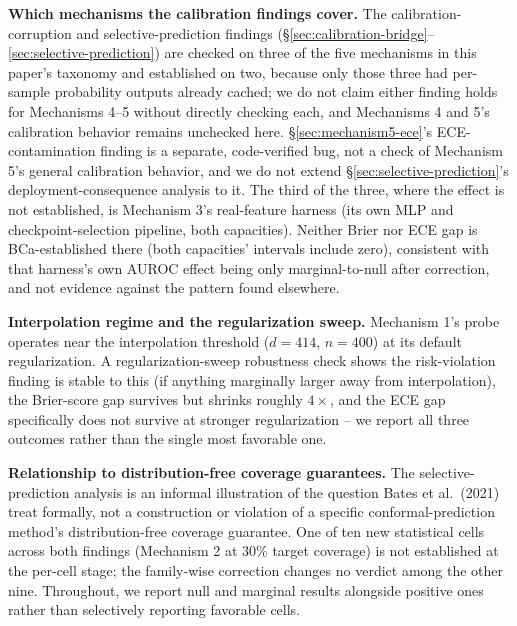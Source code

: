 \documentclass{article}
\begin{document}
\textbf{Which mechanisms the calibration findings cover.} The
calibration-corruption and selective-prediction findings
(\S\ref{sec:calibration-bridge}--\ref{sec:selective-prediction}) are checked on
three of the five mechanisms in this paper's taxonomy and established on two,
because only those three had per-sample probability outputs already cached;
we do not claim either finding holds for Mechanisms 4--5 without directly
checking each, and Mechanisms 4 and 5's calibration behavior remains unchecked
here. \S\ref{sec:mechanism5-ece}'s ECE-contamination finding is a separate,
code-verified bug, not a check of Mechanism 5's general calibration behavior,
and we do not extend \S\ref{sec:selective-prediction}'s deployment-consequence
analysis to it. The third of the three, where the effect is not
established, is Mechanism 3's real-feature harness (its own MLP and
checkpoint-selection pipeline, both capacities). Neither Brier nor ECE gap is BCa-established there (both
capacities' intervals include zero), consistent with that harness's own AUROC
effect being only marginal-to-null after correction, and not evidence against
the pattern found elsewhere.

\textbf{Interpolation regime and the regularization sweep.} Mechanism 1's probe
operates near the interpolation threshold ($d=414$, $n=400$) at its default
regularization. A regularization-sweep robustness check shows the
risk-violation finding is stable to this (if anything marginally larger away
from interpolation), the Brier-score gap survives but shrinks roughly
$4\times$, and the ECE gap specifically does not survive at stronger
regularization -- we report all three outcomes rather than the single most
favorable one.

\textbf{Relationship to distribution-free coverage guarantees.} The
selective-prediction analysis is an informal illustration of the question
Bates et al.\ (2021) treat formally, not a construction or violation of a
specific conformal-prediction method's distribution-free coverage guarantee.
One of ten new statistical cells across both findings (Mechanism 2 at $30\%$
target coverage) is not established at the per-cell stage; the family-wise
correction changes no verdict among the other nine. Throughout, we
report null and marginal results alongside positive ones rather than
selectively reporting favorable cells.
\end{document}
